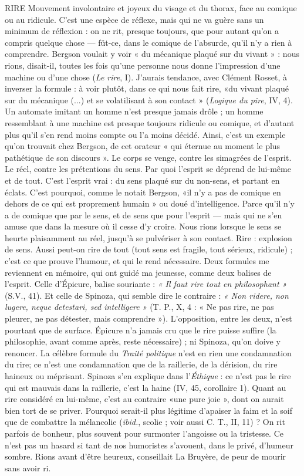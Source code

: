 RIRE Mouvement involontaire et joyeux du visage et du thorax, face au
comique ou au ridicule. C’est une espèce de réflexe, mais qui ne va
guère sans un minimum de réflexion : on ne rit, presque toujours, que pour
autant qu’on a compris quelque chose — füt-ce, dans le comique de l'absurde,
qu'il n’y a rien à comprendre. Bergson voulait y voir « du mécanique plaqué sur
du vivant » : nous rions, disait-il, toutes les fois qu’une personne nous donne
l'impression d’une machine ou d’une chose ({\it Le rire}, I). J'aurais tendance, avec
Clément Rosset, à inverser la formule : à voir plutôt, dans ce qui nous fait rire,
«du vivant plaqué sur du mécanique (...) et se volatilisant à son contact »
({\it Logique du pire}, IV, 4). Un automate imitant un homme n’est presque jamais
drôle ; un homme ressemblant à une machine est presque toujours ridicule ou
comique, et d'autant plus qu’il s’en rend moins compte ou l’a moins décidé.
Ainsi, c'est un exemple qu’on trouvait chez Bergson, de cet orateur « qui
éternue au moment le plus pathétique de son discours ». Le corps se venge,
contre les simagrées de l'esprit. Le réel, contre les prétentions du sens. Par quoi
l'esprit se déprend de lui-même et de tout. C’est l'esprit vrai : du sens plaqué
sur du non-sens, et partant en éclats. C’est pourquoi, comme le notait Bergson,
«il n’y a pas de comique en dehors de ce qui est proprement humain » ou doué
d'intelligence. Parce qu’il n’y a de comique que par le sens, et de sens que pour
l'esprit — mais qui ne s’en amuse que dans la mesure où il cesse d’y croire. Nous
rions lorsque le sens se heurte plaisamment au réel, jusqu’à se pulvériser à son
contact. Rire : explosion de sens. Aussi peut-on rire de tout (tout sens est fragile,
tout sérieux, ridicule) ; c’est ce que prouve l'humour, et qui le rend nécessaire.
Deux formules me reviennent en mémoire, qui ont guidé ma jeunesse,
comme deux balises de l'esprit. Celle d’Épicure, balise souriante : {\it « Il faut rire
tout en philosophant »} (S.V., 41). Et celle de Spinoza, qui semble dire le
contraire : {\it « Non ridere, non lugere, neque detestari, sed intelligere »} (T. P., X, 4 :
« Ne pas rire, ne pas pleurer, ne pas détester, mais comprendre »). L’opposition,
entre les deux, n’est pourtant que de surface. Épicure n’a jamais cru que
le rire puisse suffire (la philosophie, avant comme après, reste nécessaire) ; ni
Spinoza, qu'on doive y renoncer. La célèbre formule du {\it Traité politique} n’est
en rien une condamnation du rire; ce n’est une condamnation que de la
raillerie, de la dérision, du rire haineux ou méprisant. Spinoza s’en explique
dans l’{\it Éthique} : ce n’est pas le rire qui est mauvais dans la raillerie, c’est la haine
(IV, 45, corollaire 1). Quant au rire considéré en lui-même, c’est au contraire
«une pure joie », dont on aurait bien tort de se priver. Pourquoi serait-il plus
légitime d’apaiser la faim et la soif que de combattre la mélancolie ({\it ibid.},
scolie ; voir aussi C. T., II, 11) ? On rit parfois de bonheur, plus souvent pour
surmonter l'angoisse ou la tristesse. Ce n’est pas un hasard si tant de nos humoristes
s’avouent, dans le privé, d'humeur sombre. Rions avant d’être heureux,
conseillait La Bruyère, de peur de mourir sans avoir ri.

